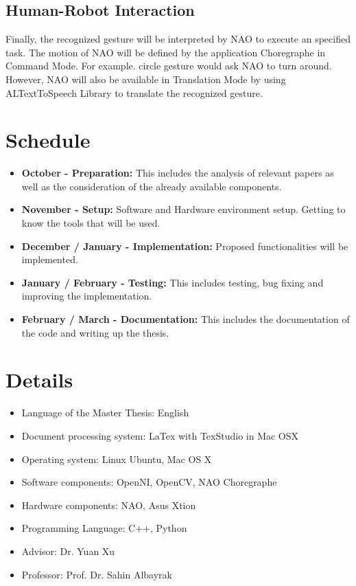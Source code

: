 \section{Human-Robot Interaction}
Finally, the recognized gesture will be interpreted by NAO to execute an specified task. The motion of NAO will be defined by the application Choregraphe in Command Mode. For example. circle gesture would ask NAO to turn around. However, NAO will also be available in Translation Mode by using ALTextToSpeech Library to translate the recognized gesture.


\chapter{Schedule}
\begin{itemize}
	\item \textbf{October - Preparation:} This includes the analysis of relevant papers as well as the consideration of the already available components.
	\item \textbf{November - Setup:} Software and Hardware environment setup. Getting to know the tools that will be used.
	\item \textbf{December / January - Implementation:} Proposed functionalities will be implemented.
	\item \textbf{January / February - Testing:} This includes testing, bug fixing and improving the implementation.
	\item \textbf{February / March - Documentation:} This includes the documentation of the code and writing up the thesis.
\end{itemize}

\chapter{Details}
\begin{itemize}
	\item Language of the Master Thesis: English
	\item Document processing system: LaTex with TexStudio in Mac OSX
	\item Operating system: Linux Ubuntu, Mac OS X
	\item Software components: OpenNI, OpenCV, NAO Choregraphe
	\item Hardware components: NAO, Asus Xtion
	\item Programming Language: C++, Python
	\item Advisor: Dr. Yuan Xu
	\item Professor: Prof. Dr. Sahin Albayrak
\end{itemize}
